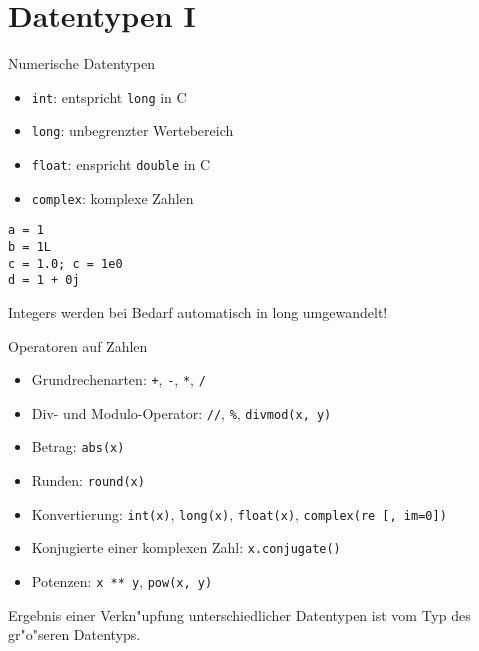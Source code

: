 \section{Datentypen I}

\begin{frame}[fragile]{Numerische Datentypen}
\begin{itemize}
\item \alert{\texttt{int}}: entspricht \texttt{long} in C
\item \alert{\texttt{long}}: unbegrenzter Wertebereich
\item \alert{\texttt{float}}: enspricht \texttt{double} in C 
\item \alert{\texttt{complex}}: komplexe Zahlen
\end{itemize} 
\begin{lstlisting}[style=Python]
a = 1
b = 1L
c = 1.0; c = 1e0
d = 1 + 0j
\end{lstlisting}
\vspace{3mm}
Integers werden bei Bedarf automatisch in long umgewandelt! 
\end{frame}

\begin{frame}{Operatoren auf Zahlen}
\begin{itemize}
\item \alert{Grundrechenarten}: \texttt{+}, \texttt{-}, \texttt{*}, \texttt{/}
\item Div- und Modulo-Operator: \texttt{//}, \hspace{1mm}\texttt{\%}, \hspace{1mm}\texttt{divmod(x, y)}
\item \alert{Betrag}: \texttt{abs(x)}
\item \alert{Runden}: \texttt{round(x)}
\item Konvertierung: \texttt{int(x)}, \texttt{long(x)}, \texttt{float(x)}, \texttt{complex(re~[, im=0])}
\item Konjugierte einer komplexen Zahl: \texttt{x.conjugate()}
\item \alert{Potenzen}: \texttt{x ** y}, \hspace{1mm}\texttt{pow(x, y)}
\end{itemize}
Ergebnis einer Verkn"upfung unterschiedlicher Datentypen ist vom Typ des \glqq gr"o"seren\grqq{} Datentyps.
\end{frame}


